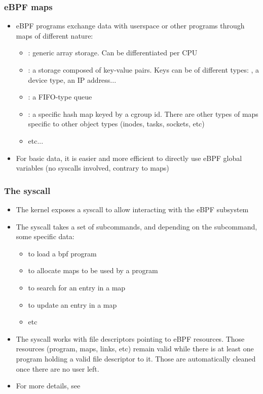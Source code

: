 \begin{frame}[fragile]
  \frametitle{eBPF maps}
  \begin{itemize}
    \item eBPF programs exchange data with userspace or other programs through
    maps of different nature:
    \begin{itemize}
      \item {}: generic array storage. Can be
      differentiated per CPU
      \item {}: a storage composed of key-value pairs.
      Keys can be of different types: , a device type, an IP address...
      \item {}: a FIFO-type queue
      \item {}: a specific hash map keyed by a
      cgroup id. There are other types of maps specific to other object types
      (inodes, tasks, sockets, etc)
      \item etc...
    \end{itemize}
    \item For basic data, it is easier and more efficient to directly use eBPF
    global variables (no syscalls involved, contrary to maps)
  \end{itemize}
\end{frame}

\begin{frame}[fragile]
  \frametitle{The  syscall}
  \begin{itemize}
    \item The kernel exposes a  syscall to allow interacting with the
    eBPF subsystem
    \item The syscall takes a set of subcommands, and depending on the
    subcommand, some specific data:
    \begin{itemize}
      \item {} to load a bpf program
      \item {} to allocate maps to be used by a program
      \item {} to search for an entry in a map
      \item {} to update an entry in a map
      \item etc
    \end{itemize}
    \item The syscall works with file descriptors pointing to eBPF resources.
    Those resources (program, maps, links, etc) remain valid while there is at least
    one program holding a valid file descriptor to it. Those are automatically cleaned
    once there are no user left.
    \item For more details, see  
  \end{itemize}
\end{frame}


